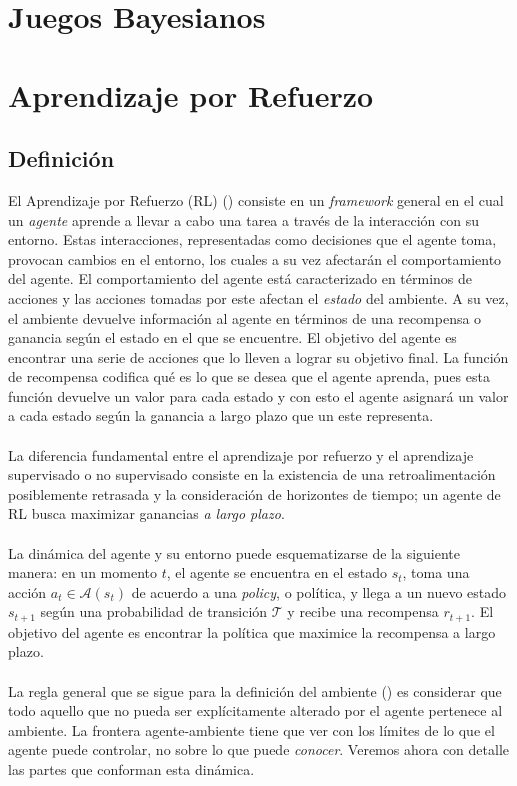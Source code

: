 \documentclass[11pt]{article}
\theoremstyle{plain}
\begin{document}
\section{Juegos Bayesianos}
\section{Aprendizaje por Refuerzo}
\subsection{Definición}
El Aprendizaje por Refuerzo (RL) (\cite{sutton1998reinforcement}) consiste en un \textit{framework} general en el cual un \textit{agente} aprende a llevar a cabo una tarea a través de la interacción con su entorno. Estas interacciones, representadas como decisiones que el agente toma, provocan cambios en el entorno, los cuales a su vez afectarán el comportamiento del agente. El comportamiento del agente está caracterizado en términos de acciones y las acciones tomadas por este afectan el \textit{estado} del ambiente. A su vez, el ambiente devuelve información al agente en términos de una recompensa o ganancia según el estado en el que se encuentre. El objetivo del agente es encontrar una serie de acciones que lo lleven a lograr su objetivo final. La función de recompensa codifica qué es lo que se desea que el agente aprenda, pues esta función devuelve un valor para cada estado y con esto el agente asignará un valor a cada estado según la ganancia a largo plazo que un este representa.\\
\\
La diferencia fundamental entre el aprendizaje por refuerzo y el aprendizaje supervisado o no supervisado consiste en la existencia de una retroalimentación posiblemente retrasada y la consideración de horizontes de tiempo; un agente de RL busca maximizar ganancias \textit{a largo plazo}.\\
\\
La dinámica del agente y su entorno puede esquematizarse de la siguiente manera: en un momento $t$, el agente se encuentra en el estado $s_t$, toma una acción $a_t \in \mathcal{A}(s_t)$ de acuerdo a una \textit{policy}, o política, y llega a un nuevo estado $s_{t+1}$ según una probabilidad de transición $\mathcal{T}$ y recibe una recompensa $r_{t+1}$. El objetivo del agente es encontrar la política que maximice la recompensa a largo plazo.\\
\\
La regla general que se sigue para la definición del ambiente (\cite{sutton1998reinforcement}) es considerar que todo aquello que no pueda ser explícitamente alterado por el agente pertenece al ambiente. La frontera agente-ambiente tiene que ver con los límites de lo que el agente puede controlar, no sobre lo que puede \textit{conocer}.
Veremos ahora con detalle las partes que conforman esta dinámica. 
\end{document}

